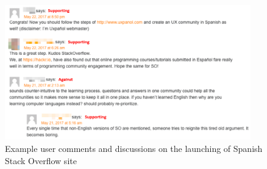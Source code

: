   
\begin{figure}
	\centering
	\includegraphics[width = 0.95\textwidth]{figures/SpanishSO.png}
	\caption{Example user comments and discussions on the launching of Spanish Stack Overflow site~\cite{web:SOspanish}}
	\centering
	\label{fig:userComments}
\end{figure}  

